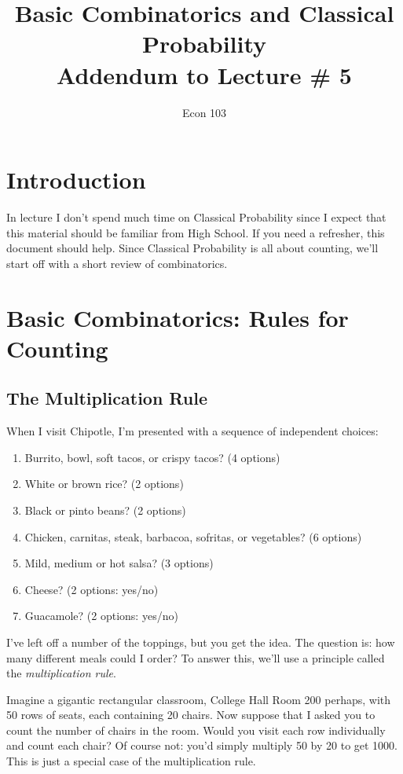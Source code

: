 \documentclass[12pt]{article}
\title{Basic Combinatorics and Classical Probability\\ \large Addendum to Lecture \# 5}
\author{Econ 103}
\date{}
\begin{document}
\maketitle

\section*{Introduction}
In lecture I don't spend much time on Classical Probability since I expect that this material should be familiar from High School.
If you need a refresher, this document should help.
Since Classical Probability is all about counting, we'll start off with a short review of combinatorics.

\section*{Basic Combinatorics: Rules for Counting}
\subsection*{The Multiplication Rule}
When I visit Chipotle, I'm presented with a sequence of independent choices:
\begin{enumerate}
  \item Burrito, bowl, soft tacos, or crispy tacos? (4 options)
  \item White or brown rice? (2 options)
  \item Black or pinto beans? (2 options)
  \item Chicken, carnitas, steak, barbacoa, sofritas, or vegetables? (6 options) 
  \item Mild, medium or hot salsa? (3 options)
  \item Cheese? (2 options: yes/no)
  \item Guacamole? (2 options: yes/no)
\end{enumerate}
I've left off a number of the toppings, but you get the idea.
The question is: how many different meals could I order?
To answer this, we'll use a principle called the \emph{multiplication rule}.

Imagine a gigantic rectangular classroom, College Hall Room 200 perhaps, with 50 rows of seats, each containing 20 chairs.
Now suppose that I asked you to count the number of chairs in the room.
Would you visit each row individually and count each chair? 
Of course not: you'd simply multiply 50 by 20 to get 1000.
This is just a special case of the multiplication rule.
\end{document}
